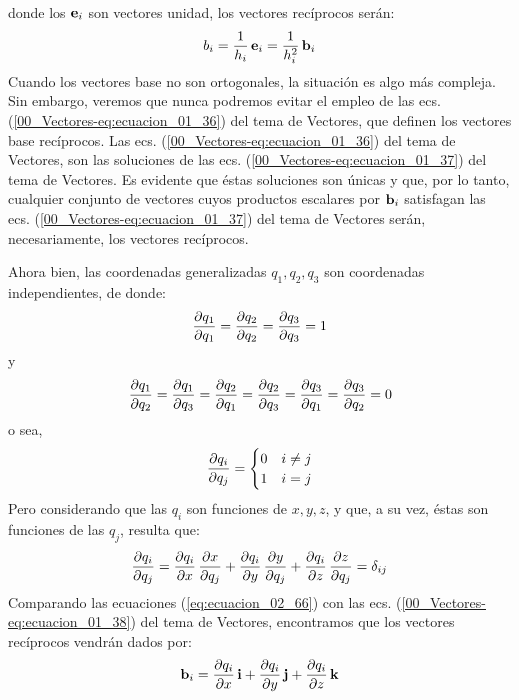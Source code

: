 donde los $\vb{e}_{i}$ son vectores unidad, los vectores recíprocos serán:
\begin{align}
    b_{i} = \dfrac{1}{h_{i}} \, \vb{e}_{i} = \dfrac{1}{h_{i}^{2}} \, \vb{b}_{i}
    \label{eq:ecuacion_02_64}
\end{align}
Cuando los vectores base no son ortogonales, la situación es algo más compleja. Sin embargo, veremos que nunca podremos evitar el empleo de las ecs. (\ref{00_Vectores-eq:ecuacion_01_36}) del tema de Vectores, que definen los vectores base recíprocos. Las ecs. (\ref{00_Vectores-eq:ecuacion_01_36}) del tema de Vectores, son las soluciones de las ecs. (\ref{00_Vectores-eq:ecuacion_01_37}) del tema de Vectores. Es evidente que éstas soluciones son únicas y que, por lo tanto, cualquier conjunto de vectores cuyos productos escalares por $\vb{b}_{i}$ satisfagan las ecs. (\ref{00_Vectores-eq:ecuacion_01_37}) del tema de Vectores serán, necesariamente, los vectores recíprocos. 
\par
Ahora bien, las coordenadas generalizadas $q_{1}, q_{2}, q_{3}$ son coordenadas independientes, de donde:
\begin{align*}
    \pdv{q_{1}}{q_{1}} = \pdv{q_{2}}{q_{2}} = \pdv{q_{3}}{q_{3}} = 1
\end{align*} 
y
\begin{align*}
    \pdv{q_{1}}{q_{2}} = \pdv{q_{1}}{q_{3}} = \pdv{q_{2}}{q_{1}} = \pdv{q_{2}}{q_{3}} = \pdv{q_{3}}{q_{1}} = \pdv{q_{3}}{q_{2}} = 0
\end{align*}
o sea,
\begin{align}
    \pdv{q_{i}}{q_{j}} = \begin{cases}
        0 & i \neq j \\
        1 & i = j
    \end{cases}
    \label{eq:ecuacion_02_65}
\end{align}
Pero considerando que las $q_{i}$ son funciones de $x, y, z$, y que, a su vez, éstas son funciones de las $q_{j}$, resulta que:
\begin{align}
    \pdv{q_{i}}{q_{j}} = \pdv{q_{i}}{x} \, \pdv{x}{q_{j}} + \pdv{q_{i}}{y} \, \pdv{y}{q_{j}} + \pdv{q_{i}}{z} \, \pdv{z}{q_{j}} = \delta_{ij}
    \label{eq:ecuacion_02_66} 
\end{align}
Comparando las ecuaciones (\ref{eq:ecuacion_02_66}) con las ecs. (\ref{00_Vectores-eq:ecuacion_01_38}) del tema de Vectores, encontramos que los vectores recíprocos vendrán dados por:
\begin{align}
    \vb{b}_{i} = \pdv{q_{i}}{x} \, \vb{i} + \pdv{q_{i}}{y} \, \vb{j} + \pdv{q_{i}}{z} \, \vb{k}
    \label{eq:ecuacion_02_67}
\end{align}
